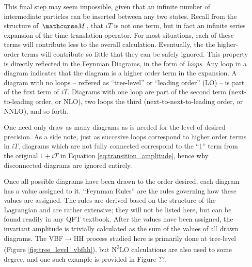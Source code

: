     This final step may seem impossible, given that an infinite number of intermediate particles can be inserted between any two states.
    Recall from the structure of $\invAmp$, that $iT$ is not one term, but in fact an infinite series expansion of the time translation operator.
    For most situations, each of these terms will contribute less to the overall calculation.
    Eventually, the the higher-order terms will contribute so little that they can be safely ignored.
    This property is directly reflected in the Feynman Diagrams, in the form of \textit{loops}.
    Any loop in a diagram indicates that the diagram is a higher order term in the expansion.
    A diagram with no loops -- reffered as ``tree-level'' or ``leading order'' (LO) -- is part of the first term of $iT$.
    Diagrams with one loop are part of the second term (next-to-leading order, or NLO),
        two loops the third (next-to-next-to-leading order, or NNLO), and so forth.

    One need only draw as many diagrams as is needed for the level of desired precision.
    As a side note, just as succesive loops correspond to higher order terms in $iT$,
        diagrams which are not fully connected correspond to the ``1'' term from the original $1+iT$ in Equation \ref{eq:transition_amplitude},
        hence why disconnected diagrams are ignored entirely.


    Once all possible diagrams have been drawn to the order desired, each diagram has a value assigned to it.
    ``Feynman Rules'' are the rules governing how these values are assigned.
    The rules are derived based on the structure of the Lagrangian and are rather extensive;
        they will not be listed here, but can be found readily in any QFT textbook.
    After the values have been assigned, the invariant amplitude is trivially calculated as the sum of the values of all drawn diagrams.
    The VBF$\rightarrow$HH process studied here is primarily done at tree-level (Figure \ref{fig:tree_level_vbfhh}),
        but N\textsuperscript{3}LO calculations are also used to some degree, and one such example is provided in Figure ??. %

